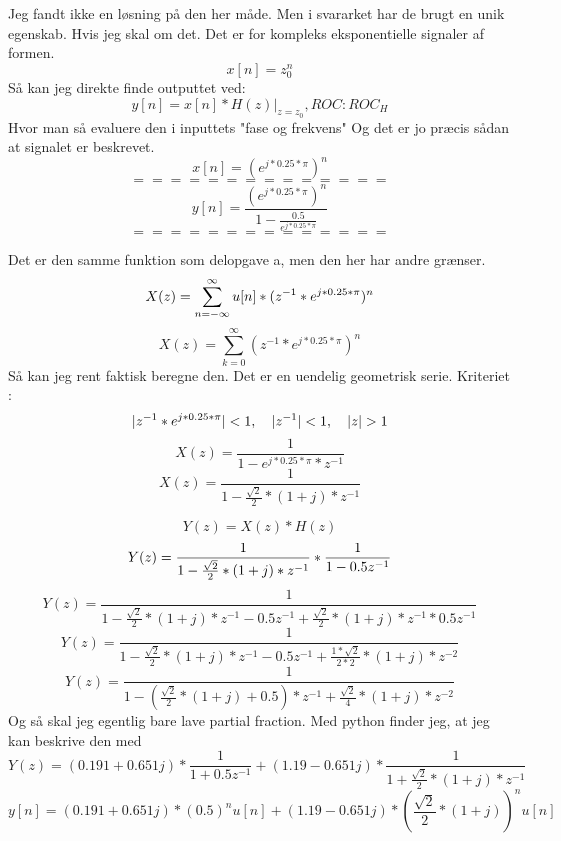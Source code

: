 \begin{Opgaver}
\begin{kapitel}[Z transformation]
\begin{Opgave}
\begin{UnderOpgave}[\text{$x[n] = e^{j*0.25*\pi * n}, \tab{0} -\infty < n < \infty$}]
                Jeg fandt ikke en løsning på den her måde. Men i svararket har de brugt en unik egenskab. Hvis jeg skal om det. 
                Det er for kompleks eksponentielle signaler af formen. 
                \[x[n] = z_0^n\]
                Så kan jeg direkte finde outputtet ved: 
                \[y[n] = x[n]*H(z)|_{z=z_0}, ROC:   ROC_H\]
                Hvor man så evaluere den i inputtets "fase og frekvens" 
                Og det er jo præcis sådan at signalet er beskrevet.
                \[x[n] = (e^{j*0.25*\pi})^n\]
                \[==============\]
                \[y[n] = \frac{(e^{j*0.25*\pi})^n}{1 - \frac{0.5}{e^{j*0.25*\pi}}}\]
                \[==============\]
                

            \end{UnderOpgave}

            \begin{UnderOpgave}[\text{$x[n] = e^{j*0.25*\pi * n}u[n]$}]
                Det er den samme funktion som delopgave a, men den her har andre grænser.
                \[X(z) = \sum_{n = -\infty}^{\infty}{u[n]*(z^{-1}*e^{j*0.25*\pi})^n}\]
                \[X(z) = \sum_{k = 0}^{\infty}{(z^{-1}*e^{j*0.25*\pi})^n}\]
                Så kan jeg rent faktisk beregne den.
                Det er en uendelig geometrisk serie. Kriteriet :
                \[|z^{-1}*e^{j*0.25*\pi}| < 1, \tab{0} |z^{-1}| < 1,\tab{0} |z| > 1\]
                \[X(z) = \frac{1}{1 - e^{j*0.25*\pi}*z^{-1}}\]
                \[X(z) = \frac{1}{1 - \frac{\sqrt{2}}{2} * (1 + j) * z^{-1}}\]

                \[Y(z) = X(z)*H(z)\]
                \[Y(z) = \frac{1}{1 - \frac{\sqrt{2}}{2} * (1 + j) * z^{-1}} * \filterZ{1}{1, -0.5}\]
                \[Y(z) = \frac{1}{1 - \frac{\sqrt{2}}{2} * (1 + j) * z^{-1} - 0.5z^{-1} + \frac{\sqrt{2}}{2} * (1 + j) * z^{-1}*0.5z^{-1}}\]
                \[Y(z) = \frac{1}{1 - \frac{\sqrt{2}}{2} * (1 + j) * z^{-1} - 0.5z^{-1} + \frac{1*\sqrt{2}}{2*2} * (1 + j) * z^{-2}}\]
                \[Y(z) = \frac{1}{1 - (\frac{\sqrt{2}}{2} * (1 + j) + 0.5) * z^{-1} + \frac{\sqrt{2}}{4} * (1 + j) * z^{-2}}\]
                Og så skal jeg egentlig bare lave partial fraction. Med python finder jeg, at jeg kan beskrive den med 
                \[Y(z) = (0.191 + 0.651j) * \frac{1}{1 + 0.5z^{-1}} + (1.19 - 0.651j) * \frac{1}{1 + \frac{\sqrt{2}}{2} * (1 + j) * z^{-1}}\]
                \[y[n] = (0.191 + 0.651j) * (0.5)^nu[n] + (1.19 - 0.651j) * (\frac{\sqrt{2}}{2} * (1 + j))^nu[n]\]\\\\
                

\end{UnderOpgave}
\end{Opgave}
\end{kapitel}
\end{Opgaver}
